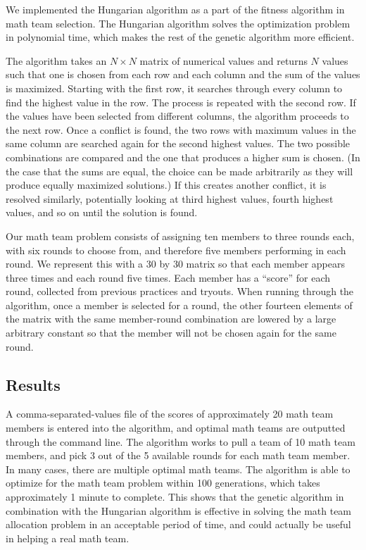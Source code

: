\documentclass[11pt,a4paper]{article}
\begin{document}
We implemented the Hungarian algorithm as a part of the fitness algorithm in math team selection. The Hungarian algorithm solves the optimization problem in polynomial time, which makes the rest of the genetic algorithm more efficient.

The algorithm takes an $N \times N$ matrix of numerical values and returns $N$ values such that one is chosen from each row and each column and the sum of the values is maximized. Starting with the first row, it searches through every column to find the highest value in the row. The process is repeated with the second row. If the values have been selected from different columns, the algorithm proceeds to the next row. Once a conflict is found, the two rows with maximum values in the same column are searched again for the second highest values. The two possible combinations are compared and the one that produces a higher sum is chosen. (In the case that the sums are equal, the choice can be made arbitrarily as they will produce equally maximized solutions.) If this creates another conflict, it is resolved similarly, potentially looking at third highest values, fourth highest values, and so on until the solution is found.

Our math team problem consists of assigning ten members to three rounds each, with six rounds to choose from, and therefore five members performing in each round. We represent this with a 30 by 30 matrix so that each member appears three times and each round five times. Each member has a ``score'' for each round, collected from previous practices and tryouts. When running through the algorithm, once a member is selected for a round, the other fourteen elements of the matrix with the same member-round combination are lowered by a large arbitrary constant so that the member will not be chosen again for the same round.

\subsection{Results}
\label{Genetic Algorithms:Results}

A comma-separated-values file of the scores of approximately 20 math team members is entered into the algorithm, and optimal math teams are outputted through the command line. The algorithm works to pull a team of 10 math team members, and pick 3 out of the 5 available rounds for each math team member. In many cases, there are multiple optimal math teams. The algorithm is able to optimize for the math team problem within 100 generations, which takes approximately 1 minute to complete. This shows that the genetic algorithm in combination with the Hungarian algorithm is effective in solving the math team allocation problem in an acceptable period of time, and could actually be useful in helping a real math team.
\end{document}
